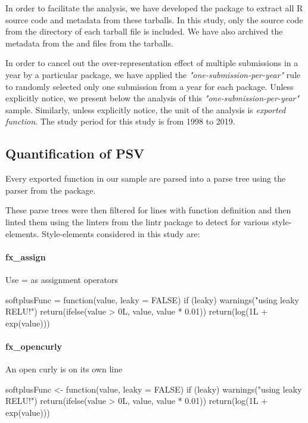 In order to facilitate the analysis, we have developed the package  \citep{chan2} to extract all R source code and metadata from these tarballs. In this study, only the source code from the  directory of each tarball file is included. We have also archived the metadata from the  and  files from the tarballs.

In order to cancel out the over-representation effect of multiple submissions in a year by a particular package, we have applied the \emph{"one-submission-per-year"} rule to randomly selected only one submission from a year for each package. Unless explicitly notice, we present below the analysis of this \emph{"one-submission-per-year"} sample. Similarly, unless explicitly notice, the unit of the analysis is \emph{exported function}. The study period for this study is from 1998 to 2019.

\subsection{Quantification of PSV}

Every exported function in our sample are parsed into a parse tree using the parser from the  \citep{lintr} package.

These parse trees were then filtered for lines with function definition and then linted them using the linters from the lintr package to detect for various style-elements. Style-elements considered in this study are:

\paragraph{fx\_assign}

Use = as assignment operators

\begin{example}
softplusFunc = function(value, leaky = FALSE) {
    if (leaky) {
        warnings("using leaky RELU!")
        return(ifelse(value > 0L, value, value * 0.01))
    }
    return(log(1L + exp(value)))
}
\end{example}

\paragraph{fx\_opencurly}

An open curly is on its own line

\begin{example}
softplusFunc <- function(value, leaky = FALSE) 
{
    if (leaky) 
    {
        warnings("using leaky RELU!")
        return(ifelse(value > 0L, value, value * 0.01))
    }
    return(log(1L + exp(value)))
}
\end{example}

